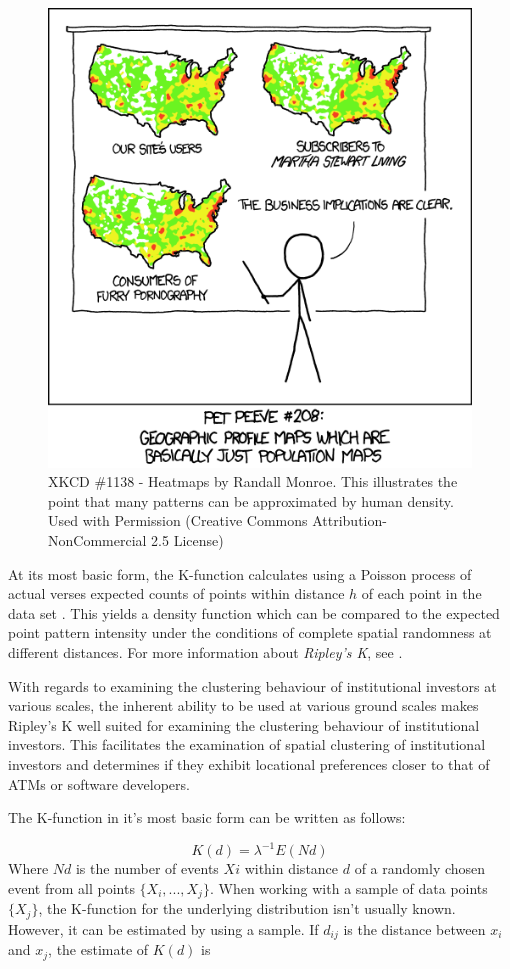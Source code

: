 \begin{figure}[h]
	\centering
	\includegraphics[width=0.5\linewidth]{Figures/ChapterIII/heatmap_XKCD}
	\caption[XKCD 1138 - Heatmaps]{XKCD \#1138 - Heatmaps by Randall Monroe. This illustrates the point that many patterns can be approximated by human density. Used with Permission (Creative Commons Attribution-NonCommercial 2.5 License)}
	\label{fig:heatmapxkcd}
\end{figure}

At its most basic form, the K-function calculates using a Poisson process of actual verses expected counts of points within distance $h$ of each point in the data set \citep{dixon2014r}.  This yields a density function which can be compared to the expected point pattern intensity under the conditions of complete spatial randomness at different distances.  For more information about\textit{ Ripley's K}, see \cite{ripley1976second,fischer2009handbook,spatstatBook}.

With regards to examining the clustering behaviour of institutional investors at various scales, the inherent ability to be used at various ground scales makes Ripley's K well suited for examining the clustering behaviour of institutional investors.  This facilitates the examination  of spatial clustering of institutional investors  and determines if they exhibit locational preferences closer to that of ATMs or software developers. 

The K-function in it's most basic form can be written as follows:  

\begin{equation}
K(d) = \lambda^{-1}E(Nd)
\end{equation}
Where $Nd$ is the number of events $Xi$ within distance $d$ of a randomly chosen event from all points $\{X_{i},...,X_{j} \}$.  When working with a sample of data points $\{ X_{j} \}$, the K-function for the underlying distribution isn't usually known.  However, it can be estimated by using a sample.  If $d_{ij}$ is the distance between $x_{i}$ and $x_{j}$, the estimate of $K(d)$ is 

